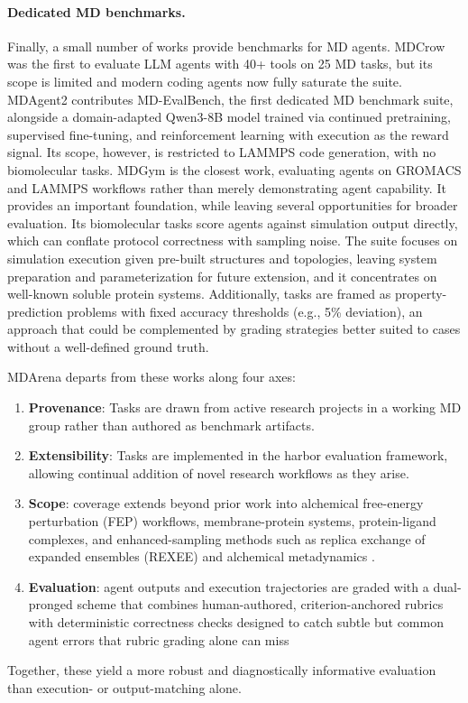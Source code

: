 \paragraph{Dedicated MD benchmarks.} Finally, a small number of works provide benchmarks for MD agents. MDCrow\cite{campbell2026mdcrow} was the first to evaluate LLM agents with 40+ tools on 25 MD tasks, but its scope is limited and modern coding agents now fully saturate the suite. MDAgent2\cite{shi2026mdagent2} contributes MD-EvalBench, the first dedicated MD benchmark suite, alongside a domain-adapted Qwen3-8B model\cite{yang2025qwen3} trained via continued pretraining, supervised fine-tuning, and reinforcement learning with execution as the reward signal. Its scope, however, is restricted to LAMMPS code generation, with no biomolecular tasks. MDGym\cite{kumar2026mdgym} is the closest work, evaluating agents on GROMACS\cite{abraham2015gromacs} and LAMMPS workflows rather than merely demonstrating agent capability. It provides an important foundation, while leaving several opportunities for broader evaluation. Its biomolecular tasks score agents against simulation output directly, which can conflate protocol correctness with sampling noise. The suite focuses on simulation execution given pre-built structures and topologies, leaving system preparation and parameterization for future extension, and it concentrates on well-known soluble protein systems. Additionally, tasks are framed as property-prediction problems with fixed accuracy thresholds (e.g., 5\% deviation), an approach that could be complemented by grading strategies better suited to cases without a well-defined ground truth. 

MDArena departs from these works along four axes:
\begin{enumerate}
    \item \textbf{Provenance}: Tasks are drawn from active research projects in a working MD group rather than authored as benchmark artifacts.
    \item \textbf{Extensibility}: Tasks are implemented in the harbor evaluation framework, allowing continual addition of novel research workflows as they arise. 
    \item \textbf{Scope}: coverage extends beyond prior work into alchemical free-energy perturbation (FEP)\cite{mey2020best} workflows, membrane-protein systems, protein-ligand complexes, and enhanced-sampling methods such as replica exchange of expanded ensembles (REXEE)\cite{hsu2024replica} and alchemical metadynamics \cite{hsu2023alchemical}.
    \item \textbf{Evaluation}: agent outputs and execution trajectories are graded with a dual-pronged scheme that combines human-authored, criterion-anchored rubrics with deterministic correctness checks designed to catch subtle but common agent errors that rubric grading alone can miss
\end{enumerate}
Together, these yield a more robust and diagnostically informative evaluation than execution- or output-matching alone.






